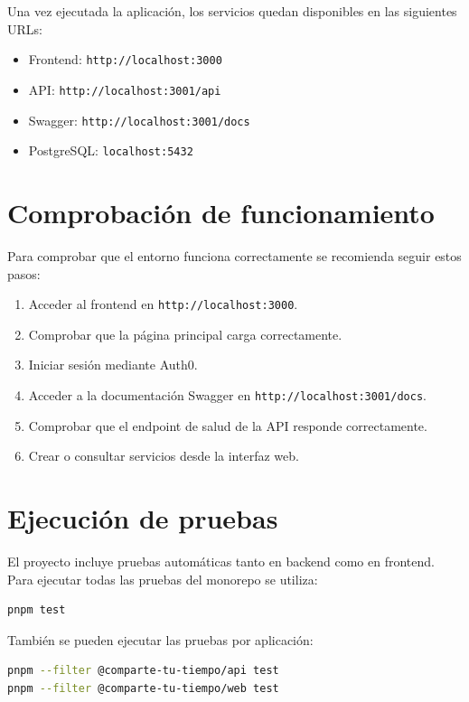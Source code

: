 Una vez ejecutada la aplicación, los servicios quedan disponibles en las siguientes URLs:

\begin{itemize}
    \item Frontend: \texttt{http://localhost:3000}
    \item API: \texttt{http://localhost:3001/api}
    \item Swagger: \texttt{http://localhost:3001/docs}
    \item PostgreSQL: \texttt{localhost:5432}
\end{itemize}

\section{Comprobación de funcionamiento}

Para comprobar que el entorno funciona correctamente se recomienda seguir estos pasos:

\begin{enumerate}
    \item Acceder al frontend en \texttt{http://localhost:3000}.
    \item Comprobar que la página principal carga correctamente.
    \item Iniciar sesión mediante Auth0.
    \item Acceder a la documentación Swagger en \texttt{http://localhost:3001/docs}.
    \item Comprobar que el endpoint de salud de la API responde correctamente.
    \item Crear o consultar servicios desde la interfaz web.
\end{enumerate}

\section{Ejecución de pruebas}

El proyecto incluye pruebas automáticas tanto en backend como en frontend. Para ejecutar todas las pruebas del monorepo se utiliza:

\begin{lstlisting}[language=bash, caption={Ejecución de pruebas del monorepo}, label={lst:manual_instalacion_tests}]
pnpm test
\end{lstlisting}

También se pueden ejecutar las pruebas por aplicación:

\begin{lstlisting}[language=bash, caption={Ejecución de pruebas por aplicación}, label={lst:manual_instalacion_tests_apps}]
pnpm --filter @comparte-tu-tiempo/api test
pnpm --filter @comparte-tu-tiempo/web test
\end{lstlisting}

